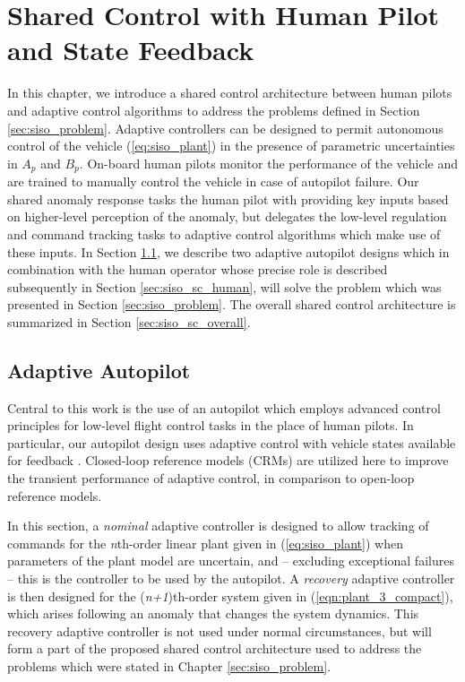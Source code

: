 \chapter{Shared Control with Human Pilot and State Feedback} \label{ch:siso_shared_ctrl}

In this chapter, we introduce a shared control architecture between human pilots and adaptive control algorithms to address the problems defined in Section \ref{sec:siso_problem}. Adaptive controllers can be designed to permit autonomous control of the vehicle (\ref{eq:siso_plant}) in the presence of parametric uncertainties in $A_p$ and $B_p$. On-board human pilots monitor the performance of the vehicle and are trained to manually control the vehicle in case of autopilot failure. Our shared anomaly response tasks the human pilot with providing key inputs based on higher-level perception of the anomaly, but delegates the low-level regulation and command tracking tasks to adaptive control algorithms which make use of these inputs. In Section \ref{sec:siso_sc_adaptive}, we describe two adaptive autopilot designs which in combination with the human operator whose precise role is described subsequently in Section \ref{sec:siso_sc_human}, will solve the problem which was presented in Section \ref{sec:siso_problem}. The overall shared control architecture is summarized in Section \ref{sec:siso_sc_overall}.

\section{Adaptive Autopilot} \label{sec:siso_sc_adaptive}
Central to this work is the use of an autopilot which employs advanced control principles for low-level flight control tasks in the place of human pilots. In particular, our autopilot design uses adaptive control with vehicle states available for feedback \cite{narendra2012stable}. Closed-loop reference models (CRMs) \cite{gibson2013adaptive} are utilized here to improve the transient performance of adaptive control, in comparison to open-loop reference models.

In this section, a \textit{nominal} adaptive controller is designed to allow tracking of commands for the \textit{n}th-order linear plant given in (\ref{eq:siso_plant}) when parameters of the plant model are uncertain, and -- excluding exceptional failures -- this is the controller to be used by the autopilot. A \textit{recovery} adaptive controller is then designed for the (\textit{n+1})th-order system given in (\ref{eqn:plant_3_compact}), which arises following an anomaly that changes the system dynamics. This recovery adaptive controller is not used under normal circumstances, but will form a part of the proposed shared control architecture used to address the problems which were stated in Chapter \ref{sec:siso_problem}.

